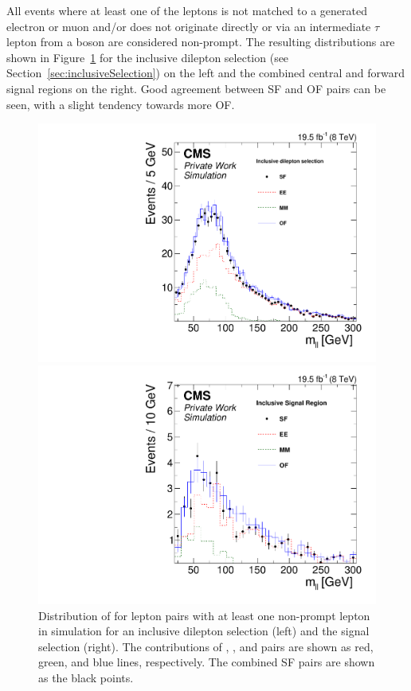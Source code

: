 All events where at least one of the leptons is not matched to a generated electron or muon and/or does not originate directly or via an intermediate $\tau$ lepton from a \W boson are considered non-prompt. The resulting \mll distributions are shown in Figure~\ref{fig:nonPromptMC} for the inclusive dilepton selection (see Section~\ref{sec:inclusiveSelection}) on the left and the combined central and forward signal regions on the right. Good agreement between SF and OF pairs can be seen, with a slight tendency towards more OF. 
\begin{figure}[htbp]
\centering
\begin{minipage}[t]{0.49\textwidth}
  \includegraphics[width=\textwidth]{plots/BG/nonPrompt/nonPromptMC_Inclusive_Full2012_Mll_None.pdf}
\end{minipage}
\begin{minipage}[t]{0.49\textwidth}
\includegraphics[width=\textwidth]{plots/BG/nonPrompt/nonPromptMC_SignalInclusive_Full2012_Mll_None.pdf}
\end{minipage}
\caption{Distribution of \mll for lepton pairs with at least one non-prompt lepton in simulation for an inclusive dilepton selection (left) and the signal selection (right). The contributions of \EE, \MM, and \EM pairs are shown as red, green, and blue lines, respectively. The combined SF pairs are shown as the black points.}
\label{fig:nonPromptMC}
\end{figure} 
